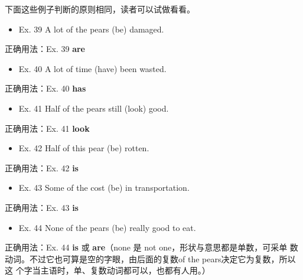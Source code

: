 \documentclass{yufa}
\begin{document}
下面这些例子判断的原则相同，读者可以试做看看。
\begin{mybox}

\begin{itemize}
\item   Ex. 39 A lot of the pears (be) damaged.
\end{itemize}

\tcblower

正确用法：Ex. 39 \textbf{are}
\end{mybox}

\begin{mybox}

\begin{itemize}
\item   Ex. 40 A lot of time (have) been wasted.
\end{itemize}

\tcblower

正确用法：Ex. 40 \textbf{has}
\end{mybox}

\begin{mybox}

\begin{itemize}
\item   Ex. 41 Half of the pears still (look) good.
\end{itemize}

\tcblower

正确用法：Ex. 41 \textbf{look}
\end{mybox}


\begin{mybox}

\begin{itemize}
\item   Ex. 42 Half of this pear (be) rotten.
\end{itemize}

\tcblower

正确用法：Ex. 42 \textbf{is}
\end{mybox}

\begin{mybox}
\begin{itemize}
\item   Ex. 43 Some of the cost (be) in transportation.
\end{itemize}

\tcblower

正确用法：Ex. 43 \textbf{is}

\end{mybox}


\begin{mybox}

\begin{itemize}
\item   Ex. 44 None of the pears (be) really good to eat.
\end{itemize}

\tcblower

正确用法：Ex. 44 \textbf{is} 或 \textbf{are}（none 是 not one，形状与意思都是单数，可采单
数动词。不过它也可算是空的字眼，由后面的复数of the pears决定它为复数，所以这
个字当主语时，单、复数动词都可以，也都有人用。）
\end{mybox}
\end{document}
